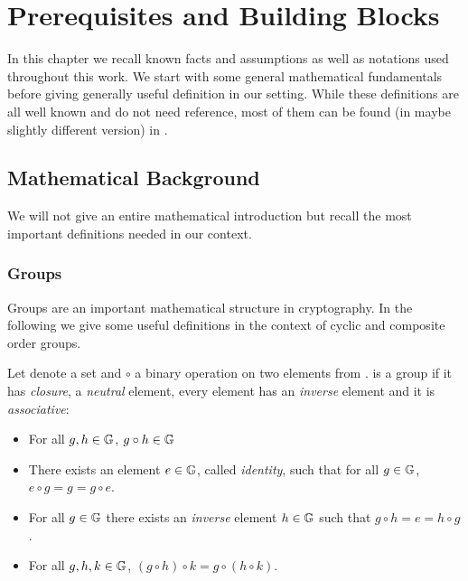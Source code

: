 
\chapter{Prerequisites and Building Blocks}

In this chapter we recall known facts and assumptions as well as notations used throughout this work.
We start with some general mathematical fundamentals before giving generally useful definition in our setting.
While these definitions are all well known and do not need reference, most of them can be found (in maybe slightly different version) in \cite{katz2008introduction}.


\section{Mathematical Background}
We will not give an entire mathematical introduction but recall the most important definitions needed in our context.

\subsection{Groups}
Groups are an important mathematical structure in cryptography.
In the following we give some useful definitions in the context of cyclic and composite order groups.

\begin{definition}[Groups]\label{def:groups}
Let \GG denote a set and $\circ$ a binary operation on two elements from \GG.
\GG is a group if it has \emph{closure}, a \emph{neutral} element, every element has an \emph{inverse} element and it is \emph{associative}:
\begin{itemize}
	\item For all $g,h\in\mathbb{G}$, $g\circ h \in\mathbb{G}$
	\item There exists an element $e\in\mathbb{G}$, called \emph{identity}, such that for all $g\in\mathbb{G}$, $e\circ g=g=g\circ e$.
	\item For all $g\in\mathbb{G}$ there exists an \emph{inverse} element $h\in\mathbb{G}$ such that $g\circ h=e=h\circ g$.
	\item For all $g,h,k\in\mathbb{G}$, $(g\circ h)\circ k=g\circ (h \circ k)$.
\end{itemize}
\eod
\end{definition}

